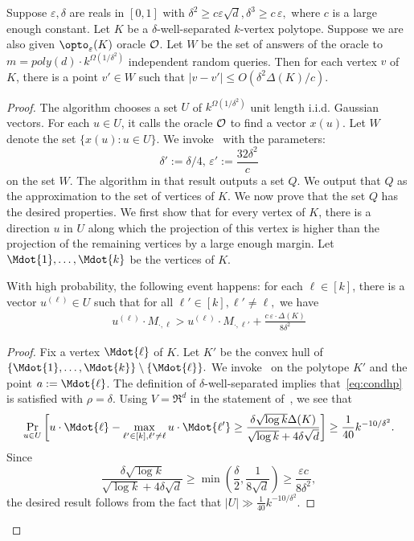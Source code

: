 \begin{theorem}\label{upper-bound-1}
Suppose $\varepsilon,\delta$ are reals in $[0,1]$ with $\delta^2\geq c\varepsilon\sqrt d, \delta^3 \geq c \, \varepsilon,$ where $c$ is a large enough constant.  Let $K$ be a $\delta$-well-separated $k$-vertex polytope. Suppose we are also given  $ \opto_\varepsilon(K)$ oracle $\cal O$. 
Let $W$ be the set of answers of the oracle to $m=poly(d)\cdot k^{\Omega(1/\delta^2)}$ independent random queries. Then for each vertex $v$ of $K$, there is a point $v' \in W$ such that $|v-v'| \leq O(\delta^2 \Delta(K)/c).$
\end{theorem}
\begin{proof}
 The algorithm chooses a set $U$ of $k^{\Omega(1/\delta^2)}$ unit length i.i.d. Gaussian vectors. For each $u\in U$, it calls the oracle $\cal O$ to find a vector $x(u)$. Let $W$ denote the set $\{x(u): u \in U\}$. We invoke~ with the parameters: 
$$ \delta' := \delta/4, \, \varepsilon' := \frac{32 \delta^2}{c}$$
on the set $W$. The algorithm in that result outputs a set $Q$. We output that $Q$ as the approximation to the set of vertices of $K$. We now prove that the set $Q$ has the desired properties. We first show that for every vertex of $K$, there is a direction $u$ in $U$ along which the projection of this vertex is higher than the projection of the remaining vertices by a large enough margin. 
Let $\Mdot{1}, \ldots, \Mdot{k}$ be the vertices of $K$. 
\begin{claim}
    \label{cl:ul}
    With high probability, the following event happens: for each $\ell \in [k]$, there is a vector $u^{(\ell)} \in U$ such that for all $\ell' \in [k], \ell' \neq \ell,$ we have
    \begin{align}
        \label{eq:100}
        u^{(\ell)}\cdot M_{\cdot, \ell}> u^{(\ell)}\cdot M_{\cdot, \ell'}+\frac{c \, \varepsilon \cdot \Delta(K)}{8 \delta^2}
    \end{align}
\end{claim}

\begin{proof}
    Fix a vertex $\Mdot{\ell}$ of $K$.  Let $K'$ be the convex hull of $\{\Mdot{1}, \ldots, \Mdot{k} \} \setminus \{\Mdot{\ell}\}.$ We invoke~ on the polytope $K'$ and the point $a := \Mdot{\ell}$. The definition of $\delta$-well-separated implies that~\eqref{eq:condhp} is satisfied with $\rho = \delta$. Using $V = \Re^d$ in the statement of~, we see that $$\Pr_{u \in U} \left[ u \cdot \Mdot{\ell} - \max_{\ell' \in [k], \ell' \neq \ell} u \cdot \Mdot{\ell'} \geq \frac{\delta \sqrt{\log k} \Delta(K)}{\sqrt{\log k} + 4 \delta \sqrt{d}} \right] \geq \frac{1}{40} k^{-10/\delta^2}.$$
    Since 
    $$\frac{\delta \sqrt{\log k}}{\sqrt{\log k} + 4 \delta \sqrt{d}}  \geq \min \left( \frac{\delta}{2}, \frac{1}{8 \sqrt{d}} \right) \geq \frac{\varepsilon c}{8 \delta^2}, $$
    the desired result follows from the fact that $|U| \gg \frac{1}{40} k^{-10/\delta^2}.$
    

\end{proof}
\end{proof}
